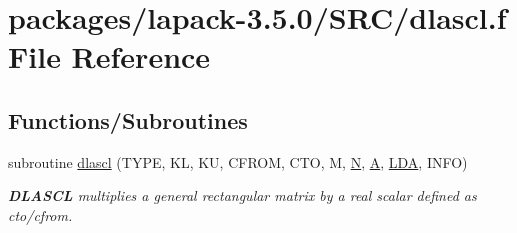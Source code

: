 \hypertarget{dlascl_8f}{}\section{packages/lapack-\/3.5.0/\+S\+R\+C/dlascl.f File Reference}
\label{dlascl_8f}
\subsection*{Functions/\+Subroutines}
\begin{DoxyCompactItemize}
\item 
subroutine \hyperlink{group__auxOTHERauxiliary_ga7bce4c35ec5a86ee0bfdd15c476d99c8}{dlascl} (T\+Y\+P\+E, K\+L, K\+U, C\+F\+R\+O\+M, C\+T\+O, M, \hyperlink{polmisc_8c_a0240ac851181b84ac374872dc5434ee4}{N}, \hyperlink{classA}{A}, \hyperlink{example__user_8c_ae946da542ce0db94dced19b2ecefd1aa}{L\+D\+A}, I\+N\+F\+O)
\begin{DoxyCompactList}\small\item\em {\bfseries D\+L\+A\+S\+C\+L} multiplies a general rectangular matrix by a real scalar defined as cto/cfrom. \end{DoxyCompactList}\end{DoxyCompactItemize}

